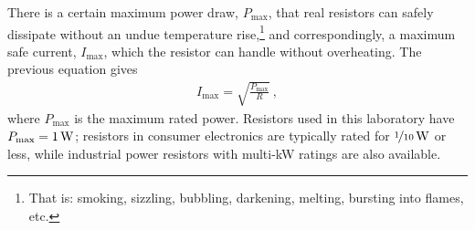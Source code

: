\documentclass[12pt]{article}
\begin{document}
There is a certain maximum power draw, $P_\mathrm{max}$, that real
resistors can safely dissipate without an undue temperature
rise,\footnote{That is: smoking, sizzling, bubbling, darkening,
  melting, bursting into flames, etc.}  and correspondingly, a maximum
safe current, $I_\mathrm{max}$, which the resistor can handle without
overheating.  The previous equation gives
\begin{gather*}
  I_\mathrm{max} = \sqrt{\frac{P_\mathrm{max}}{R}}\ ,
\end{gather*}
where $P_\mathrm{max}$ is the maximum rated power.  Resistors used in
this laboratory have $P_\mathrm{max} = \unit[1]{W}$; resistors in
consumer electronics are typically rated for
$\unit[\nicefrac{1}{10}]{W}$ or less, while industrial power resistors
with multi-\unit{kW} ratings are also available.
\end{document}
